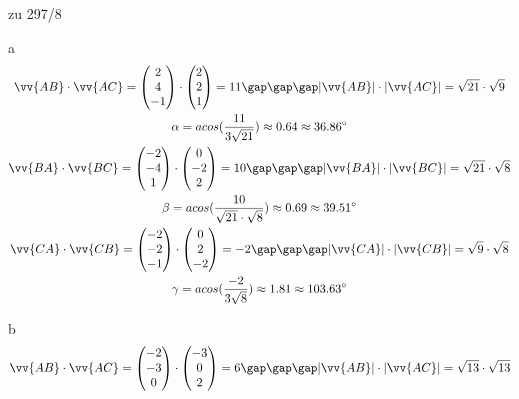 \newpage
\begin{exercise}{zu 297/8}
  \item [a]
  \begin{gather*}
    \vv{AB} \cdot \vv{AC} = \begin{pmatrix}2 \\ 4 \\ -1\end{pmatrix} \cdot \begin{pmatrix}2 \\ 2 \\ 1\end{pmatrix} = 11 \gap\gap\gap |\vv{AB}| \cdot |\vv{AC}| = \sqrt{21} \cdot \sqrt{9} \\
    \alpha = acos(\frac{11}{3\sqrt{21}}) \approx 0.64 \approx 36.86^\circ \\
    \vv{BA} \cdot \vv{BC} = \begin{pmatrix}-2 \\ -4 \\ 1\end{pmatrix} \cdot \begin{pmatrix}0 \\ -2 \\ 2\end{pmatrix} = 10 \gap\gap\gap |\vv{BA}| \cdot |\vv{BC}| = \sqrt{21} \cdot \sqrt{8} \\
    \beta = acos(\frac{10}{\sqrt{21} \cdot \sqrt{8}}) \approx 0.69 \approx 39.51^\circ \\
    \vv{CA} \cdot \vv{CB} = \begin{pmatrix}-2 \\ -2 \\ -1\end{pmatrix} \cdot \begin{pmatrix}0 \\ 2 \\ -2\end{pmatrix} = -2 \gap\gap\gap |\vv{CA}| \cdot |\vv{CB}| = \sqrt{9} \cdot \sqrt{8} \\
    \gamma = acos(\frac{-2}{3\sqrt{8}}) \approx 1.81 \approx 103.63^\circ
  \end{gather*}
  \item [b]
  \begin{gather*}
    \vv{AB} \cdot \vv{AC} = \begin{pmatrix}-2 \\ -3 \\ 0\end{pmatrix} \cdot \begin{pmatrix}-3 \\ 0 \\ 2\end{pmatrix} = 6 \gap\gap\gap |\vv{AB}| \cdot |\vv{AC}| = \sqrt{13} \cdot \sqrt{13} \\

\end{gather*}
\end{exercise}
